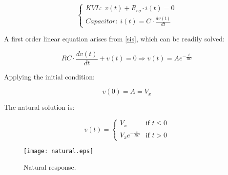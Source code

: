 \begin{equation}
  \begin{cases}
    KVL:\; v(t) + R_{eq} \cdot i(t) = 0 \\
    Capacitor:\; i(t) = C \cdot \frac{dv(t)}{dt}
  \end{cases}
  \label{sis}
\end{equation}

A first order linear equation arises from \ref{sis}, which can be readily solved:

\begin{equation}
  RC \cdot \frac{dv(t)}{dt} + v(t) = 0 \Rightarrow v(t) = Ae^{-\frac{t}{RC}}
\end{equation}

Applying the initial condition:

\begin{equation}
  v(0) = A = V_x
\end{equation}

The natural solution is:

\begin{equation}
  \label{nat_sol} v(t) =
  \begin{cases}
    V_x & \mbox{if } t \leq 0 \\
    V_xe^{-\frac{t}{RC}} & \mbox{if } t > 0
  \end{cases}
\end{equation}

\begin{figure}[H]
  \centering
  \texttt{[image: natural.eps]}
  \caption{Natural response.}
  \label{fig:nat}
\end{figure}
